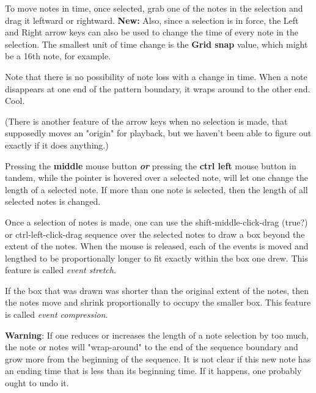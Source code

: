    To move notes in time, once selected, grab one of the notes in the
   selection and drag it leftward or rightward.
   \textbf{New:}
   Also, since a selection is in force, the Left and Right arrow keys can also
   be used to change the time of every note in the selection.
   The smallest unit of time change is the \textbf{Grid snap} value,
   which might be a 16th note, for example.

   Note that there is no possibility of note loss with a change in time.  When
   a note disappears at one end of the pattern boundary, it wraps around to the
   other end.  Cool.

   (There is another feature of the arrow keys when no selection is made, that
   supposedly moves an "origin" for playback, but we haven't been able to
   figure out exactly if it does anything.)

   Pressing the \textbf{middle} mouse button \textbf{\textsl{or}}
   pressing the \textbf{ctrl left} mouse button in tandem, while the pointer is
   hovered over a selected note, will let one
   change the length of a selected note.  If more than one note is selected,
   then the length of all selected notes is changed.

   Once a selection of notes is made, one can use the
   shift-middle-click-drag (true?) or ctrl-left-click-drag
   sequence over the selected notes to
   draw a box beyond the extent of the notes.  When the mouse is released,
   each of the events is moved and lengthed to be proportionally longer to
   fit exactly within the box one drew.
   This feature is called \textsl{event stretch}.

   If the box that was drawn was shorter than the original extent of the
   notes, then the notes move and shrink proportionally to occupy the
   smaller box.
   This feature is called \textsl{event compression}.
   
   \textbf{Warning}:  If one reduces or increases the length of a note selection
   by too much, the note or notes will "wrap-around" to the end of the sequence
   boundary and grow more from the beginning of the sequence. 
   It is not clear if this new note has an ending time that is less than its
   beginning time.  If it happens, one probably ought to undo it.

